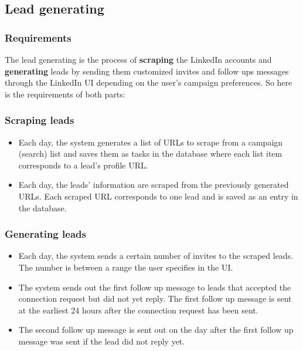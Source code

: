 \subsection{Lead generating}

\subsubsection{Requirements}
The lead generating is the process of \textbf{scraping} the LinkedIn accounts and \textbf{generating} leads by sending them customized invites and follow ups messages through the LinkedIn UI depending on the user's campaign preferences.
So here is the requirements of both parts:

\subsubsection{Scraping leads}
\begin{itemize}
	\item Each day, the system generates a list of URLs to scrape from a campaign (search) list and saves them as tasks in the database where each list item corresponds to a lead's profile URL.
	\item Each day, the leads' information are scraped from the previously generated URLs. Each scraped URL corresponds to one lead and is saved as an entry in the database.
\end{itemize}

\subsubsection{Generating leads}
\begin{itemize}
	\item Each day, the system sends a certain number of invites to the scraped leads. The number is between a range the user specifies in the UI.
	\item The system sends out the first follow up message to leads that accepted the connection request but did not yet reply. The first follow up message is sent at the earliest 24 hours after the connection request has been sent.
	\item The second follow up message is sent out on the day after the first follow up message was sent if the lead did not reply yet.
\end{itemize}

\newpage

